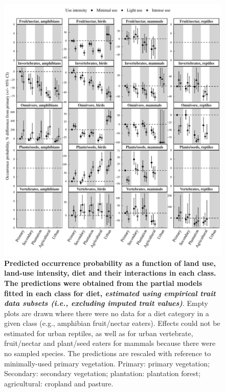 \begin{figure}[h!]
\centering
\includegraphics[scale=0.65]{Supporting/Chapter4/Figures/Partial_models_predictions/Validations/Diet}
\caption[Predicted occurrence probability as a function of land use, land-use intensity, diet and their interactions in each class: from validation models using empirical, non imputed trait values]{\textbf{Predicted occurrence probability as a function of land use, land-use intensity, diet and their interactions in each class. The predictions were obtained from the partial models fitted in each class for diet, \textit{estimated using empirical trait data subsets (i.e., excluding imputed trait values)}}. Empty plots are drawn where there were no data for a diet category in a given class (e.g., amphibian fruit/nectar eaters). Effects could not be estimated for urban reptiles, as well as for urban vertebrate, fruit/nectar and plant/seed eaters for mammals because there were no sampled species. The predictions are rescaled with reference to minimally-used primary vegetation. Primary: primary vegetation; Secondary: secondary vegetation; plantation: plantation forest; agricultural: cropland and pasture.}
\label{SI_4_Figure23}
\end{figure}


